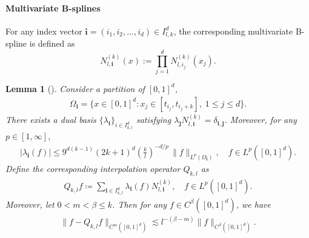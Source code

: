 \documentclass{article}
\theoremstyle{plain}
\newtheorem{lemma}[theorem]{Lemma}
\theoremstyle{definition}
\theoremstyle{remark}
\begin{document}
\paragraph{Multivariate B-splines} For any index vector $\bm{i} = (i_{1}, i_{2}, \ldots, i_{d}) \in I^{d}_{l,k}$, the corresponding multivariate B-spline is defined as 
\begin{equation*}
N^{(k)}_{l,\bm{i}}(x) := \prod_{j=1}^{d} N^{(k)}_{l,i_{j}}(x_{j}).
\end{equation*}

\begin{lemma}[\cite{schumaker2007spline}] \label{bspline_approximation}
    Consider a partition of $[0, 1]^d$,
    \begin{align*}
        \Omega_{\bm{i}} = \{x \in [0,1]^d: x_{j} \in [t_{i_{j}}, t_{i_{j}+k}], \; 1 \leq j \leq d\}.
    \end{align*}
    There exists a dual basis $\{\lambda_{\bm{i}}\}_{i \in I^d_{k, l}}$ satisfying $\lambda_{\bm{j}} N^{(k)}_{l, \bm{i}} = \delta_{\bm{i}, \bm{j}}$. Moreover, for any $p \in [1, \infty]$,
    \begin{align} \label{interpolation_operator_boundedness}
        |\lambda_{\bm{i}}(f)| \leq 9^{d(k-1)}(2k+1)^{d} \left(\frac{k}{l}\right)^{-d/p} \, \|f\|_{L^{p}(\Omega_{\bm{i}})}, 
\quad  f \in L^{p}([0,1]^d).
    \end{align}
    Define the corresponding interpolation operator $Q_{k, l}$ as 
    \begin{align} \label{interpolation_operator}
        Q_{k, l} f \coloneqq \sum_{\bm{i} \in I_{k, l}^d } \lambda_{\bm{i}}(f) N_{l, \bm{i}}^{(k)}, \quad f \in L^p([0, 1]^d). 
    \end{align}
    Moreover, let $0 < m < \beta \leq k$. Then for any $f \in C^{\beta}([0,1]^d)$, we have 
    \begin{align*}
        \|f - Q_{k, l} f\|_{C^m([0, 1]^d)} \lesssim l^{-(\beta-m)} \|f\|_{C^{\beta}([0,1]^d)}.
    \end{align*}
\end{lemma} 
\end{document}
